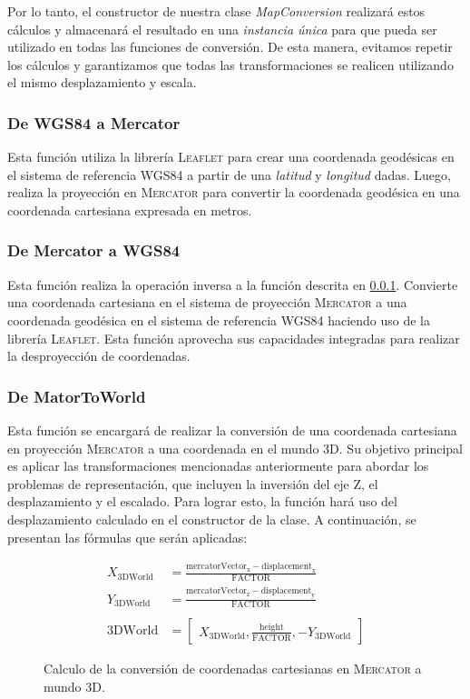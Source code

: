 \documentclass[a4paper, 11pt]{book}
\begin{document}
Por lo tanto, el constructor de nuestra clase \emph{MapConversion} realizará estos cálculos y almacenará el resultado en una \emph{instancia única} para que pueda ser utilizado en todas las funciones de conversión. De esta manera, evitamos repetir los cálculos y garantizamos que todas las transformaciones se realicen utilizando el mismo desplazamiento y escala.
\subsubsection{De WGS84 a Mercator}
\label{funcion:deegreeToMeter}
Esta función utiliza la librería \textsc{Leaflet} para crear una coordenada geodésicas en el sistema de referencia \textsc{WGS84} a partir de una \emph{latitud} y \emph{longitud} dadas. Luego, realiza la proyección en \textsc{Mercator} para convertir la coordenada geodésica en una coordenada cartesiana expresada en metros.
\subsubsection{De Mercator a WGS84}
\label{funcion:meterToDegree}
Esta función realiza la operación inversa a la función descrita en \ref{funcion:deegreeToMeter}. Convierte una coordenada cartesiana en el sistema de proyección \textsc{Mercator} a una coordenada geodésica en el sistema de referencia \textsc{WGS84} haciendo uso de la librería \textsc{Leaflet}. Esta función aprovecha sus capacidades integradas para realizar la desproyección de coordenadas.
\subsubsection{De MatorToWorld}
Esta función se encargará de realizar la conversión de una coordenada cartesiana en proyección \textsc{Mercator} a una coordenada en el mundo 3D. Su objetivo principal es aplicar las transformaciones mencionadas anteriormente para abordar los problemas de representación, que incluyen la inversión del eje \textsc{Z}, el desplazamiento y el escalado. Para lograr esto, la función hará uso del desplazamiento calculado en el constructor de la clase. A continuación, se presentan las fórmulas que serán aplicadas:

\begin{figure}[h]
    \begin{align*}
    X_{\text{3DWorld}} &= \frac{\mathbf{\mathrm{mercatorVector}}_{\text{x}} - \mathbf{\mathrm{displacement}}_{\text{x}}}{\mathbf{\mathrm{FACTOR}}} \\
    Y_{\text{3DWorld}} &= \frac{\mathbf{\mathrm{mercatorVector}}_{\text{z}} - \mathbf{\mathrm{displacement}}_{\text{y}}}{\mathbf{\mathrm{FACTOR}}} \\\\
    \mathbf{\mathrm{3DWorld}} &= 
    \begin{bmatrix}
    X_{\text{3DWorld}}, \frac{\mathrm{height}}{\mathbf{\mathrm{FACTOR}}}, -Y_{\text{3DWorld}}
    \end{bmatrix}
    \end{align*}
\caption{Calculo de la conversión de coordenadas cartesianas en \textsc{Mercator} a mundo \textsc{3D}.}
  \label{formula:mercatorToWorld}
\end{figure}
\end{document}
